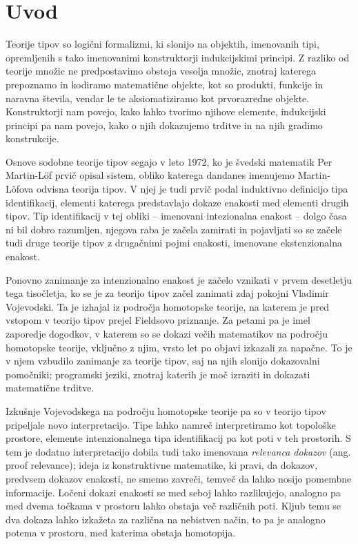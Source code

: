 \section{Uvod}

Teorije tipov so logični formalizmi, ki slonijo na objektih, imenovanih tipi, opremljenih s tako imenovanimi konstruktorji indukcijskimi principi. Z razliko od teorije množic ne predpostavimo obstoja vesolja množic, znotraj katerega prepoznamo in kodiramo matematične objekte, kot so produkti, funkcije in naravna števila, vendar le te aksiomatiziramo kot prvorazredne objekte. Konstruktorji nam povejo, kako lahko tvorimo njihove elemente, indukcijski principi pa nam povejo, kako o njih dokazujemo trditve in na njih gradimo konstrukcije.

Osnove sodobne teorije tipov segajo v leto 1972, ko je švedski matematik Per Martin-Löf prvič opisal sistem, obliko katerega dandanes imenujemo Martin-Löfova odvisna teorija tipov. V njej je tudi prvič podal induktivno definicijo tipa identifikacij, elementi katerega predstavlajo dokaze enakosti med elementi drugih tipov. Tip identifikacij v tej obliki -- imenovani intezionalna enakost -- dolgo časa ni bil dobro razumljen, njegova raba je začela zamirati in pojavljati so se začele tudi druge teorije tipov z drugačnimi pojmi enakosti, imenovane ekstenzionalna enakost.

Ponovno zanimanje za intenzionalno enakost je začelo vznikati v prvem desetletju tega tisočletja, ko se je za teorijo tipov začel zanimati zdaj pokojni Vladimir Vojevodski. Ta je izhajal iz področja homotopske teorije, na katerem je pred vstopom v teorijo tipov prejel Fieldsovo priznanje. Za petami pa je imel zaporedje dogodkov, v katerem so se dokazi večih matematikov na področju homotopske teorije, vključno z njim, vrsto let po objavi izkazali za napačne. To je v njem vzbudilo zanimanje za teorije tipov, saj na njih slonijo dokazovalni pomočniki; programski jeziki, znotraj katerih je moč izraziti in dokazati matematične trditve.

Izkušnje Vojevodskega na področju homotopske teorije pa so v teorijo tipov pripeljale novo interpretacijo. Tipe lahko namreč interpretiramo kot topološke prostore, elemente intenzionalnega tipa identifikacij pa kot poti v teh prostorih. S tem je dodatno interpretacijo dobila tudi tako imenovana \emph{relevanca dokazov} (ang. proof relevance); ideja iz konstruktivne matematike, ki pravi, da dokazov, predvsem dokazov enakosti, ne smemo zavreči, temveč da lahko nosijo pomembne informacije. Ločeni dokazi enakosti se med seboj lahko razlikujejo, analogno pa med dvema točkama v prostoru lahko obstaja več različnih poti. Kljub temu se dva dokaza lahko izkažeta za različna na nebistven način, to pa je analogno potema v prostoru, med katerima obstaja homotopija.

